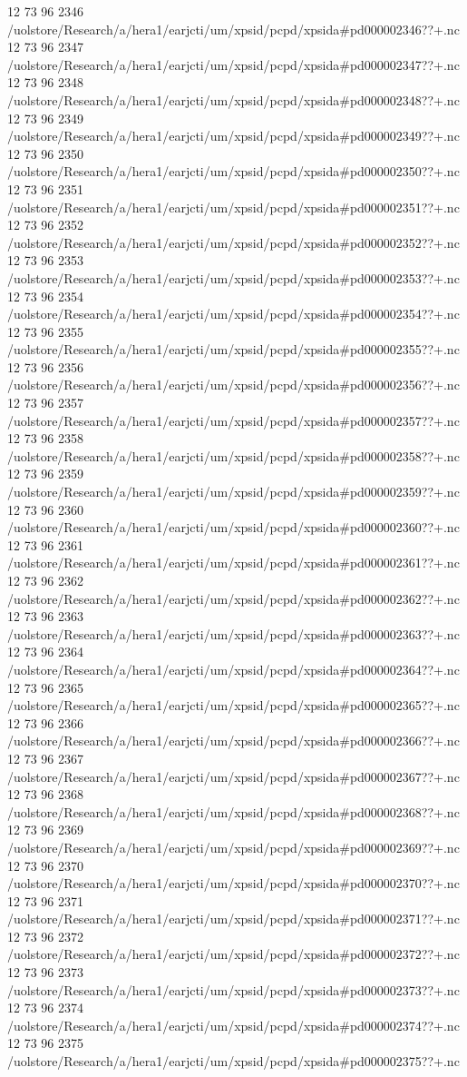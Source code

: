 12 73 96
2346
/uolstore/Research/a/hera1/earjcti/um/xpsid/pcpd/xpsida#pd000002346??+.nc
12 73 96
2347
/uolstore/Research/a/hera1/earjcti/um/xpsid/pcpd/xpsida#pd000002347??+.nc
12 73 96
2348
/uolstore/Research/a/hera1/earjcti/um/xpsid/pcpd/xpsida#pd000002348??+.nc
12 73 96
2349
/uolstore/Research/a/hera1/earjcti/um/xpsid/pcpd/xpsida#pd000002349??+.nc
12 73 96
2350
/uolstore/Research/a/hera1/earjcti/um/xpsid/pcpd/xpsida#pd000002350??+.nc
12 73 96
2351
/uolstore/Research/a/hera1/earjcti/um/xpsid/pcpd/xpsida#pd000002351??+.nc
12 73 96
2352
/uolstore/Research/a/hera1/earjcti/um/xpsid/pcpd/xpsida#pd000002352??+.nc
12 73 96
2353
/uolstore/Research/a/hera1/earjcti/um/xpsid/pcpd/xpsida#pd000002353??+.nc
12 73 96
2354
/uolstore/Research/a/hera1/earjcti/um/xpsid/pcpd/xpsida#pd000002354??+.nc
12 73 96
2355
/uolstore/Research/a/hera1/earjcti/um/xpsid/pcpd/xpsida#pd000002355??+.nc
12 73 96
2356
/uolstore/Research/a/hera1/earjcti/um/xpsid/pcpd/xpsida#pd000002356??+.nc
12 73 96
2357
/uolstore/Research/a/hera1/earjcti/um/xpsid/pcpd/xpsida#pd000002357??+.nc
12 73 96
2358
/uolstore/Research/a/hera1/earjcti/um/xpsid/pcpd/xpsida#pd000002358??+.nc
12 73 96
2359
/uolstore/Research/a/hera1/earjcti/um/xpsid/pcpd/xpsida#pd000002359??+.nc
12 73 96
2360
/uolstore/Research/a/hera1/earjcti/um/xpsid/pcpd/xpsida#pd000002360??+.nc
12 73 96
2361
/uolstore/Research/a/hera1/earjcti/um/xpsid/pcpd/xpsida#pd000002361??+.nc
12 73 96
2362
/uolstore/Research/a/hera1/earjcti/um/xpsid/pcpd/xpsida#pd000002362??+.nc
12 73 96
2363
/uolstore/Research/a/hera1/earjcti/um/xpsid/pcpd/xpsida#pd000002363??+.nc
12 73 96
2364
/uolstore/Research/a/hera1/earjcti/um/xpsid/pcpd/xpsida#pd000002364??+.nc
12 73 96
2365
/uolstore/Research/a/hera1/earjcti/um/xpsid/pcpd/xpsida#pd000002365??+.nc
12 73 96
2366
/uolstore/Research/a/hera1/earjcti/um/xpsid/pcpd/xpsida#pd000002366??+.nc
12 73 96
2367
/uolstore/Research/a/hera1/earjcti/um/xpsid/pcpd/xpsida#pd000002367??+.nc
12 73 96
2368
/uolstore/Research/a/hera1/earjcti/um/xpsid/pcpd/xpsida#pd000002368??+.nc
12 73 96
2369
/uolstore/Research/a/hera1/earjcti/um/xpsid/pcpd/xpsida#pd000002369??+.nc
12 73 96
2370
/uolstore/Research/a/hera1/earjcti/um/xpsid/pcpd/xpsida#pd000002370??+.nc
12 73 96
2371
/uolstore/Research/a/hera1/earjcti/um/xpsid/pcpd/xpsida#pd000002371??+.nc
12 73 96
2372
/uolstore/Research/a/hera1/earjcti/um/xpsid/pcpd/xpsida#pd000002372??+.nc
12 73 96
2373
/uolstore/Research/a/hera1/earjcti/um/xpsid/pcpd/xpsida#pd000002373??+.nc
12 73 96
2374
/uolstore/Research/a/hera1/earjcti/um/xpsid/pcpd/xpsida#pd000002374??+.nc
12 73 96
2375
/uolstore/Research/a/hera1/earjcti/um/xpsid/pcpd/xpsida#pd000002375??+.nc
